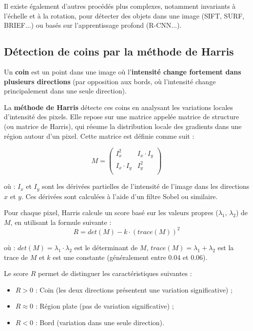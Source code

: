 \documentclass[a4paper,11pt,titlepage]{article} %
\begin{document}
Il existe également d'autres procédés plus complexes, notamment invariants à l'échelle et à la rotation, pour détecter des objets dans une image (SIFT, SURF, BRIEF...) ou basés sur l'apprentissage profond (R-CNN...).


\subsection{Détection de coins par la méthode de Harris}

Un \textbf{coin} est un point dans une image où l'\textbf{intensité change fortement dans plusieurs directions} (par opposition aux bords, où l'intensité change principalement dans une seule direction).

La \textbf{méthode de Harris} détecte ces coins en analysant les variations locales d'intensité des pixels. Elle repose sur une matrice appelée matrice de structure (ou matrice de Harris), qui résume la distribution locale des gradients dans une région autour d'un pixel. Cette matrice est définie comme suit :

$$M = \begin{pmatrix}
I_x^2 & I_x \cdot I_y \\
I_x \cdot I_y & I_y^2\\
\end{pmatrix}$$


où : $I_x$ et $I_y$ sont les dérivées partielles de l'intensité de l'image dans les directions $x$ et $y$. Ces dérivées sont calculées à l'aide d'un filtre Sobel ou similaire.


Pour chaque pixel, Harris calcule un score basé sur les valeurs propres ($\lambda_1$, $\lambda_2$) de $M$, en utilisant la formule suivante : 
$$R = det(M) - k \cdot (trace(M))^2$$
 
où : $det(M) = \lambda_1 \cdot \lambda_2$ est le déterminant de $M$, $trace(M) = \lambda_1 + \lambda_2$ est la trace de $M$ et $k$ est une constante (généralement entre 0.04 et 0.06).

Le score $R$ permet de distinguer les caractéristiques suivantes :

\begin{itemize}
	\item $R > 0$ : Coin (les deux directions présentent une variation significative) ;
	\item $R \approx 0$ : Région plate (pas de variation significative) ;
	\item $R < 0$ : Bord (variation dans une seule direction). 
\end{itemize}
\end{document}
